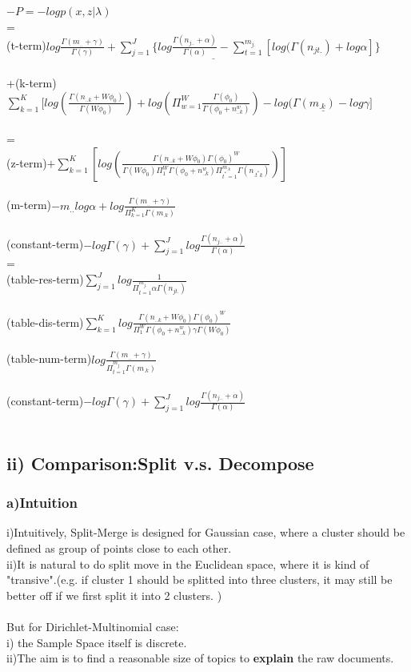 \documentclass{article}
\begin{document}
\begin{spacing}{1.1}
$-P=-log p(x,z|\lambda)$\\ =\\
(t-term)$ \underline{log \frac{\Gamma(m_{..}+\gamma)}{\Gamma(\gamma)}+\sum_{j=1}^{J} \{log \frac{\Gamma(n_{j..}+\alpha)}{\Gamma(\alpha)}-\sum_{t=1}^{m_{j.}}[log(\Gamma(n_{jt.})+log \alpha
]\}}$\\ \\
+(k-term)$ \sum_{k=1}^{K} [log(\frac{\Gamma(n_{..k}+W\phi_{0})}{\Gamma(W\phi_{0})})+log(\Pi_{w=1}^{W}\frac{\Gamma(\phi_{0})}{\Gamma(\phi_{0}+n_{..k}^{w})})
-\underline{log(\Gamma(m_{.k})-log \gamma]}$\\ \\ 
=\\
(z-term)$ +\sum_{k=1}^{K} [log(\frac{\Gamma(n_{..k}+W\phi_{0})\Gamma(\phi_{0})^{W}}{\Gamma(W\phi_{0})\Pi_{1}^{W}\Gamma(\phi_{0}+n_{..k}^{w})\Pi_{t^{*}=1}^{m_{.k}}\Gamma(n_{.t^{*}k})})]$\\ \\
(m-term)$-m_{..}log\alpha+log\frac{\Gamma(m_{..}+\gamma)}{\Pi_{k=1}^{K}\Gamma(m_{.k})}$\\ \\
(constant-term)$-log\Gamma(\gamma)+\sum_{j=1}^{J} log \frac{\Gamma(n_{j..}+\alpha)}{\Gamma(\alpha)}$
\\ 
=\\
(table-res-term)$\sum_{j=1}^{J} log \frac{1}{\Pi_{t=1}^{m_{j.}}\alpha\Gamma(n_{jt.})}$\\ \\
(table-dis-term)$\sum_{k=1}^{K} log \frac{\Gamma(n_{..k}+W\phi_{0})\Gamma(\phi_{0})^{W}}{\Pi_{1}^{W}\Gamma(\phi_{0}+n_{..k}^{w})\gamma\Gamma(W\phi_{0})}$\\ \\
(table-num-term)$log \frac{\Gamma(m_{..}+\gamma)}{\Pi_{t=1}^{m_{j.}}\Gamma(m_{.k})}$\\ \\
(constant-term)$-log\Gamma(\gamma)+\sum_{j=1}^{J} log \frac{\Gamma(n_{j..}+\alpha)}{\Gamma(\alpha)}$
\\ \\
\subsection{ii) Comparison:Split v.s. Decompose}
\subsubsection{a)Intuition}
i)Intuitively, Split-Merge is designed for Gaussian case, where a cluster should be defined as group of points close to each other. \\
ii)It is natural to do split move in the Euclidean space, where it is kind of "transive".(e.g. if cluster 1 should be splitted into
three clusters, it may still be better off if we first split it into 2 clusters.
)\\ \\
But for Dirichlet-Multinomial case:\\
i) the Sample Space itself is discrete.\\
ii)The aim is to find a reasonable size of topics to {\bf explain} the raw documents.\\ \\

\end{spacing}
\end{document}

